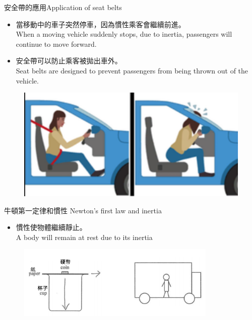 \documentclass[beamer=true]{standalone}
\begin{document}
\begin{frame}{安全帶的應用Application of seat belts}
    \begin{itemize}
        \item 當移動中的車子突然停車，因為慣性乘客會繼續前進。\\When a moving vehicle suddenly stops, due to inertia, passengers will continue to move forward.
        \item 安全帶可以防止乘客被拋出車外。\\Seat belts are designed to prevent passengers from being thrown out of the vehicle.
    \end{itemize}
    \begin{figure}[h!]
        \centering
        \includegraphics[width=.5\textwidth]{assets/88ea2a86.png}
    \end{figure}
\end{frame}

\begin{frame}{牛頓第一定律和慣性 Newton's first law and inertia}
    \begin{itemize}
        \item 慣性使物體繼續靜止。 \\A body will remain at rest due to its inertia
    \end{itemize}
    \begin{figure}[h!]
        \centering
        \includegraphics[width=0.85\textwidth]{assets/d5349655.png}
    \end{figure}
\end{frame}
\end{document}
